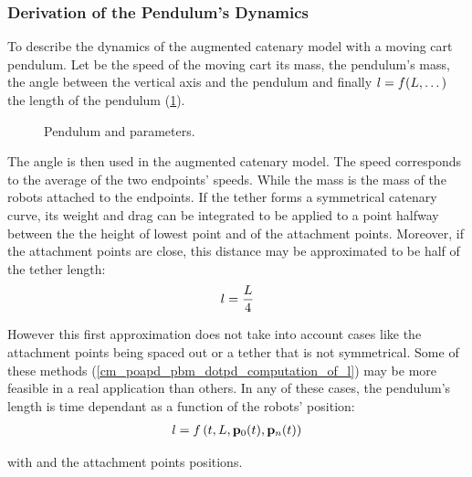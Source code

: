 \subsubsection{Derivation of the Pendulum's Dynamics}
\label{cm_poapd_pbm_derivation_of_the_pendulums_dynamics}

To describe the dynamics of the augmented catenary model with a moving cart pendulum. Let
 be the speed of the moving cart  its mass,  the pendulum's
mass, \scal{\alpha} the angle between the vertical axis and the pendulum and finally
$l=f(L, \dots)$ the length of the pendulum (\cref{cm_poapd_pbm_dotpd_schematic}).

\begin{figure}
	\centering
	\caption{Pendulum and parameters.}
	\label{cm_poapd_pbm_dotpd_schematic}
\end{figure}

The angle \scal{\alpha} is then used in the augmented catenary model. The speed 
corresponds to the average of the two endpoints' speeds. While the mass  is the mass
of the robots attached to the endpoints. If the tether forms a symmetrical catenary curve, its
weight and drag can be integrated to be applied to a point halfway between the the height of lowest
point and of the attachment points. Moreover, if the attachment points are close, this distance may
be approximated to be half of the tether length:
\begin{align}
	l = \frac{L}{4}
	\label{cm_poapd_pbm_dotpd_l_4}
\end{align}

However this first approximation does not take into account cases like the attachment points being
spaced out or a tether that is not symmetrical. Some of these methods
(\cref{cm_poapd_pbm_dotpd_computation_of_l}) may be more feasible in a real application than
others. In any of these cases, the pendulum's length is time dependant as a function of the robots'
position:
\begin{align}
	\scal{l} = f\left(\scal{t}, \catL{}, \ldpoint{P}{0}(t), \ldpoint{P}{n}(t)\right)
	\label{cm_poapd_pbm_dotpd_function_l}
\end{align}

with  and  the attachment points positions.

